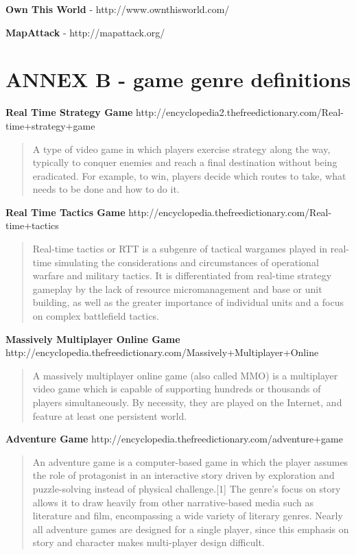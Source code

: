 \documentclass{article}
\begin{document}
\textbf{Own This World} - http://www.ownthisworld.com/ \newline

\textbf{MapAttack} - http://mapattack.org/ \newline



\section{ANNEX B - game genre definitions}


\textbf{Real Time Strategy Game}		
http://encyclopedia2.thefreedictionary.com/Real-time+strategy+game
\begin{quote}
A type of video game in which players exercise strategy along the way, typically
to conquer enemies and reach a final destination without being eradicated. For
example, to win, players decide which routes to take, what needs to be done and
how to do it.
\end{quote}

\textbf{Real Time Tactics Game}
	http://encyclopedia.thefreedictionary.com/Real-time+tactics
\begin{quote}
Real-time tactics or RTT is a subgenre of tactical wargames played in real-time
simulating the considerations and circumstances of operational warfare and
military tactics. It is differentiated from real-time strategy gameplay by the
lack of resource micromanagement and base or unit building, as well as the
greater importance of individual units and a focus on complex battlefield
tactics.
\end{quote}

\textbf{Massively Multiplayer Online Game}		
	http://encyclopedia.thefreedictionary.com/Massively+Multiplayer+Online
\begin{quote}
A massively multiplayer online game (also called MMO) is a multiplayer video
game which is capable of supporting hundreds or thousands of players
simultaneously. By necessity, they are played on the Internet, and feature at
least one persistent world.
\end{quote}
	
\textbf{Adventure Game}		
	http://encyclopedia.thefreedictionary.com/adventure+game
\begin{quote}
An adventure game is a computer-based game in which the player assumes the role
of protagonist in an interactive story driven by exploration and puzzle-solving
instead of physical challenge.[1] The genre's focus on story allows it to draw
heavily from other narrative-based media such as literature and film,
encompassing a wide variety of literary genres. Nearly all adventure games are
designed for a single player, since this emphasis on story and character makes
multi-player design difficult.
\end{quote}
\end{document}
